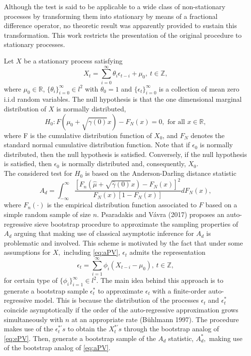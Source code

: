 Although the test is said to be applicable to a wide class of non-stationary processes by transforming them into stationary by means of a fractional difference operator, no theoretic result was apparently provided to sustain this transformation. This work restricts the presentation of the original procedure to stationary processes.

Let \(X\) be a stationary process satisfying
\begin{equation}
 X_t = \sum_{i=0}^{\infty}\theta_i \epsilon_{t-i} + \mu_0, \ t \in \mathbb{Z}, \label{eq:aPV}
\end{equation}
where \(\mu_0 \in \mathbb{R}\), \(\{\theta_i\}_{i=0}^\infty\in l^2\) with \(\theta_0 = 1\) and \(\{\epsilon_t\}_{i=0}^\infty\) is a collection of mean zero i.i.d random variables. The null hypothesis is that the one dimensional marginal distribution of \(X\) is normally distributed,
\[
 H_0: F(\mu_0 +\sqrt{\gamma(0)}x)-F_N(x) = 0, \text{ for all } x\in \mathbb{R},
\]
where F is the cumulative distribution function of \(X_0\), and \(F_N\) denotes the standard normal cumulative distribution function. Note that if \(\epsilon_0\) is normally distributed, then the null hypothesis is satisfied. Conversely, if the null hypothesis is satisfied, then \(\epsilon_0\) is normally distributed and, consequently, \(X_0\).\\
The considered test for \(H_0\) is based on the Anderson-Darling distance statistic
\begin{equation}
 A_d = \int_{-\infty}^{\infty}\dfrac{[{F_n}(\widehat{\mu}+\sqrt{\widehat{\gamma}(0)}x)-F_N(x)]^2}{F_N(x)[1-F_N(x)]}dF_N(x), \label{eq:aPV1}
\end{equation}
where \({F_n}(\cdot)\) is the empirical distribution function associated to \(F\) based on a simple random sample of size \(n\). Psaradakis and Vávra (2017) proposes an auto-regressive sieve bootstrap procedure to approximate the sampling properties of \(A_d\) arguing that making use of classical asymptotic inference for \(A_d\) is problematic and involved. This scheme is motivated by the fact that under some assumptions for \(X,\) including \eqref{eq:aPV}, \(\epsilon_t\) admits the representation
\begin{equation}
 \epsilon_t = \sum_{i=1}^{\infty}\phi_i(X_{t-i} - \mu_0), \ t \in \mathbb{Z}, \label{eq:ePV}
\end{equation}
for certain type of \(\{\phi_i\}_{i=1}^\infty\in l^2\). The main idea behind this approach is to generate a bootstrap sample \(\epsilon_t^*\) to approximate \(\epsilon_t\) with a finite-order auto-regressive model. This is because the distribution of the processes \(\epsilon_t\) and \(\epsilon_t^*\) coincide asymptotically if the order of the auto-regressive approximation grows simultaneously with \(n\) at an appropriate rate (Bühlmann 1997). The procedure makes use of the \(\epsilon_t^{*'}s\) to obtain the \(X_t^{*'}s\) through the bootstrap analog of \eqref{eq:ePV}. Then, generate a bootstrap sample of the \(A_d\) statistic, \(A_d^{*},\) making use of the bootstrap analog of \eqref{eq:aPV}.

